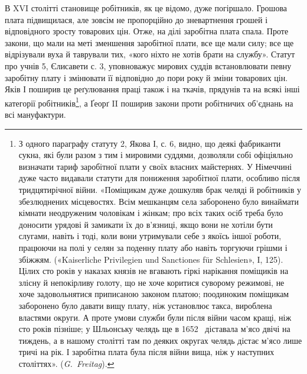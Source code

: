 В XVI столітті становище робітників, як це відомо, дуже
погіршало. Грошова плата підвищилася, але зовсім не пропорційно
до зневартнення грошей і відповідного зросту товарових цін.
Отже, на ділі заробітна плата спала. Проте закони, що мали на
меті зменшення заробітної плати, все ще мали силу; все ще відрізували
вуха й таврували тих, «кого ніхто не хотів брати на
службу». Статут про учнів 5, Єлисавети с. 3, уповноважує мирових
суддів встановлювати певну заробітну плату і змінювати
її відповідно до пори року й зміни товарових цін. Яків І поширив
це реґулювання праці також і на ткачів, прядунів та на всякі
інші категорії робітників\footnote{
З одного параграфу статуту 2, Якова І, с. 6, видно, що деякі
фабриканти сукна, які були разом з тим і мировими суддями, дозволяли
собі офіціяльно визначати тариф заробітної плати у своїх власних майстернях.
У Німеччині дуже часто видавали статути для пониження
заробітної плати, особливо після тридцятирічної війни. «Поміщикам
дуже дошкуляв брак челяді й робітників у збезлюднених місцевостях.
Всім мешканцям села заборонено було винаймати кімнати неодруженим
чоловікам і жінкам; про всіх таких осіб треба було доносити урядові
й замикати їх до в’язниці, якщо вони не хотіли бути слугами, навіть
і тоді, коли вони утримували себе з якоїсь іншої роботи, працюючи на
полі у селян за поденну плату або навіть торгуючи грішми і збіжжям.
(«Kaiserliche Privilegien und Sanctiones für Schlesien», I, 125). Цілих
сто років у наказах князів не вгавають гіркі нарікання поміщиків на
злісну й непокірливу голоту, що не хоче коритися суворому режимові,
не хоче задовольнятися приписаною законом платою; поодиноким поміщикам
заборонено було давати вищу плату, ніж установлює такса, вироблена
властями округи. А проте умови служби були після війни
часом кращі, ніж сто років пізніше; у Шльонську челядь ще в 1652~
діставала м’ясо двічі на тиждень, а в нашому столітті там по деяких
округах челядь дістає м’ясо лише тричі на рік. І заробітна плата була
після війни вища, ніж у наступних століттях». (\emph{G.~Freitag}).},
а Ґеорґ II поширив закони проти
робітничих об’єднань на всі мануфактури.

